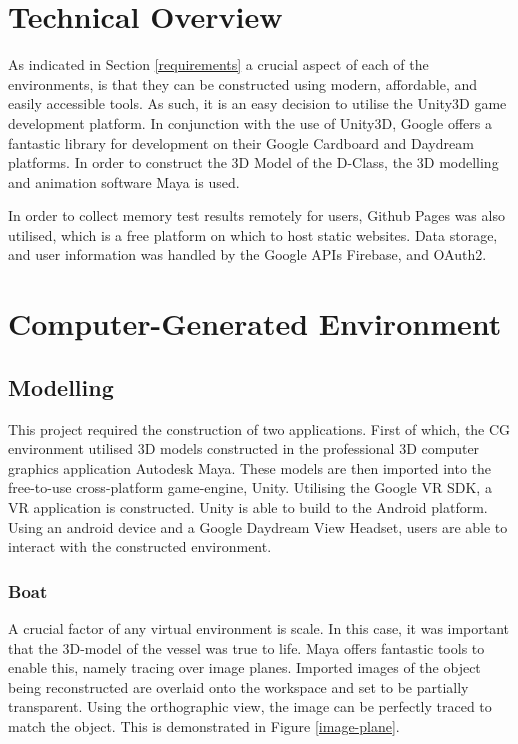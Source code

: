 \documentclass[ %
                    author={Elis Jones},
                supervisor={Dr. Kirsten Cater},
                    degree={BSc},
                     title={The Effect of Presentation Medium on Spatial Cognition},
                  subtitle={in the Virtual Environment},
                      year={2018} ]{dissertation}
\begin{document}
\section{Technical Overview}
As indicated in Section \ref{requirements} a crucial aspect of each of the environments, is that they can be constructed using modern, affordable, and easily accessible tools. As such, it is an easy decision to utilise the Unity3D game development platform. In conjunction with the use of Unity3D, Google offers a fantastic library for development on their Google Cardboard and Daydream platforms. In order to construct the 3D Model of the D-Class, the 3D modelling and animation software Maya is used. 

In order to collect memory test results remotely for users, Github Pages was also utilised, which is a free platform on which to host static websites. Data storage, and user information was handled by the Google APIs Firebase, and OAuth2.

\section{Computer-Generated Environment}
\subsection{Modelling}
This project required the construction of two applications. First of which, the CG environment utilised 3D models constructed in the professional 3D computer graphics application Autodesk Maya. These models are then imported into the free-to-use cross-platform game-engine, Unity. Utilising the Google VR SDK, a VR application is constructed. Unity is able to build to the Android platform. Using an android device and a Google Daydream View Headset, users are able to interact with the constructed environment.

\subsubsection{Boat}
A crucial factor of any virtual environment is scale. In this case, it was important that the 3D-model of the vessel was true to life. Maya offers fantastic tools to enable this, namely tracing over image planes. Imported images of the object being reconstructed are overlaid onto the workspace and set to be partially transparent. Using the orthographic view, the image can be perfectly traced to match the object. This is demonstrated in Figure \ref{image-plane}. 
\end{document}
